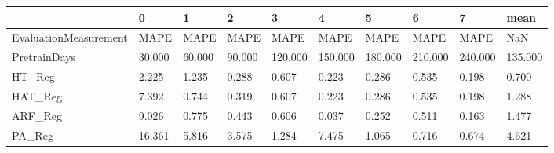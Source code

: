 \begin{tabular}{llllllllll}
\toprule
{} &      0 &      1 &      2 &       3 &       4 &       5 &       6 &       7 &    mean \\
\midrule
EvaluationMeasurement &   MAPE &   MAPE &   MAPE &    MAPE &    MAPE &    MAPE &    MAPE &    MAPE &     NaN \\
PretrainDays          & 30.000 & 60.000 & 90.000 & 120.000 & 150.000 & 180.000 & 210.000 & 240.000 & 135.000 \\
HT\_Reg                &  2.225 &  1.235 &  0.288 &   0.607 &   0.223 &   0.286 &   0.535 &   0.198 &   0.700 \\
HAT\_Reg               &  7.392 &  0.744 &  0.319 &   0.607 &   0.223 &   0.286 &   0.535 &   0.198 &   1.288 \\
ARF\_Reg               &  9.026 &  0.775 &  0.443 &   0.606 &   0.037 &   0.252 &   0.511 &   0.163 &   1.477 \\
PA\_Reg                & 16.361 &  5.816 &  3.575 &   1.284 &   7.475 &   1.065 &   0.716 &   0.674 &   4.621 \\
\bottomrule
\end{tabular}
